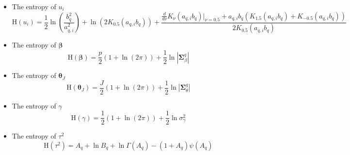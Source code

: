\documentclass[12pt]{article}
\newcommand{\bs}{\boldsymbol}
\begin{document}
  \begin{itemize}
    \item The entropy of $u_{i}$
    \begin{equation}
      \mathrm{H}\left(u_{i}\right) = \dfrac{1}{2}\ln\left(\dfrac{b_{q}^{2}}{a_{q,i}^{2}}\right)+\ln\left(2K_{0.5}\left(a_{q,i}b_{q}\right)\right)+\dfrac{\frac{d}{d\nu}K_{\nu}\left(a_{q,i}b_{q}\right)\Big|_{\nu=0.5}+a_{q,i}b_{q}\left(K_{1.5}\left(a_{q,i}b_{q}\right)+K_{-0.5}\left(a_{q,i}b_{q}\right)\right)}{2K_{0.5}\left(a_{q,i}b_{q}\right)}
    \end{equation}
    \item The entropy of $\bs{\beta}$
    \begin{equation}
      \mathrm{H}\left(\bs{\beta}\right) = \dfrac{p}{2}\left(1+\ln\left(2\pi\right)\right)+\dfrac{1}{2}\ln\left|\bs{\Sigma}_{\beta}^{q}\right|
    \end{equation}
    \item The entropy of $\bs{\theta}_{J}$
    \begin{equation}
      \mathrm{H}\left(\bs{\theta}_{J}\right) = \dfrac{J}{2}\left(1+\ln\left(2\pi\right)\right)+\dfrac{1}{2}\ln\left|\bs{\Sigma}_{\theta}^{q}\right|
    \end{equation}
    \item The entropy of $\gamma$
    \begin{equation}
      \mathrm{H}\left(\gamma\right) = \dfrac{1}{2}\left(1+\ln\left(2\pi\right)\right)+\dfrac{1}{2}\ln\sigma_{\gamma}^{2}
    \end{equation}
    \item The entropy of $\tau^{2}$
    \begin{equation}
      \mathrm{H}\left(\tau^{2}\right) = A_{q}+\ln B_{q}+\ln\Gamma\left(A_{q}\right)-\left(1+A_{q}\right)\psi\left(A_{q}\right)
    \end{equation}
  \end{itemize}
\end{document}
